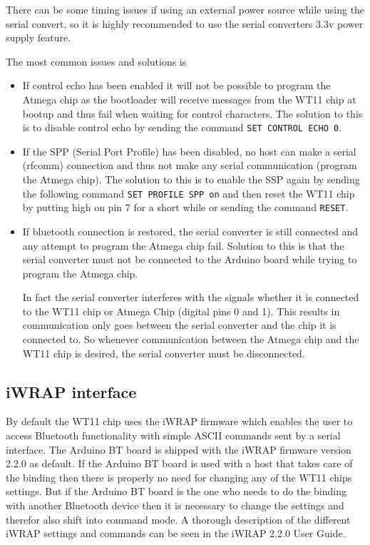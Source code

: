\documentclass[a4paper, oneside, final]{memoir}
\begin{document}
There can be some timing issues if using an external power source while using
the serial convert, so it is highly recommended to use the serial converters
3.3v power supply feature.

The most common issues and solutions is

\begin{itemize}
\item If control echo has been enabled it will not be possible to program the
  Atmega chip as the bootloader will receive messages from the WT11 chip at
  bootup and thus fail when waiting for control characters. The solution to this
  is to disable control echo by sending the command \texttt{SET CONTROL ECHO 0}.

\item If the SPP (Serial Port Profile) has been disabled, no host can make a
  serial (rfcomm) connection and thus not make any serial communication (program
  the Atmega chip). The solution to this is to enable the SSP again by sending
  the following command \texttt{SET PROFILE SPP on} and then reset the WT11 chip
  by putting high on pin 7 for a short while or sending the command
  \texttt{RESET}.

\item If bluetooth connection is restored, the serial converter is still
  connected and any attempt to program the Atmega chip fail. Solution to this is
  that the serial converter must not be connected to the Arduino board while
  trying to program the Atmega chip. 

  In fact the serial converter interferes with the signals whether it is
  connected to the WT11 chip or Atmega Chip (digital pins 0 and 1). This results
  in communication only goes between the serial converter and the chip it is
  connected to. So whenever communication between the Atmega chip and the WT11
  chip is desired, the serial converter must be disconnected.
\end{itemize}

\subsection{iWRAP interface}

By default the WT11 chip uses the iWRAP firmware which enables the user to
access Bluetooth functionality with simple ASCII commands sent by a serial
interface. The Arduino BT board is shipped with the iWRAP firmware version 2.2.0
as default. If the Arduino BT board is used with a host that takes care of the
binding then there is properly no need for changing any of the WT11 chips
settings. But if the Arduino BT board is the one who needs to do the binding
with another Bluetooth device then it is necessary to change the settings and
therefor also shift into command mode. A thorough description of the different
iWRAP settings and commands can be seen in the iWRAP 2.2.0 User
Guide\cite{iWRAP220UG}.
\end{document}
